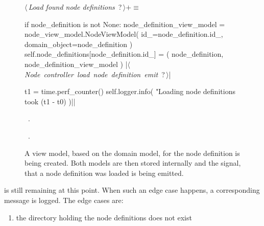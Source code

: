 \documentclass[%
    a4paper,    %
    justified,  %
    nobib,      %
    openany     %
]{tufte-book}
\begin{document}
\begin{figure}[!h]
  \begin{flushleft} \small
\begin{minipage}{\linewidth}\label{scrap8}\raggedright\small
{} $\langle\,${\itshape Load found node definitions}\nobreak\ {\footnotesize {?}}$\,\rangle+\equiv$
\vspace{-1ex}
\begin{pythoncode}
    if node_definition is not None:
        node_definition_view_model = node_view_model.NodeViewModel(
            id_=node_definition.id_,
            domain_object=node_definition
        )
        self.node_definitions[node_definition.id_] = (
            node_definition,
            node_definition_view_model
        )
        |\hbox{$\langle\,${\itshape Node controller load node definition emit}\nobreak\ {\footnotesize ?}$\,\rangle$}|

t1 = time.perf_counter()
self.logger.info(
    "Loading node definitions took %
    (t1 - t0)
)|\NWsep|
\end{pythoncode}
\vspace{1.5ex}
\footnotesize
\begin{list}{}{\setlength{\itemsep}{-\parsep}\setlength{\itemindent}{-\leftmargin}}
\item \NWtxtMacroDefBy\ .
\item \NWtxtMacroRefIn\ .

\item{}
\end{list}
\end{minipage}\vspace{4ex}
\end{flushleft}
\caption{A view model, based on the domain model, for the node definition is
    being created. Both models are then stored internally and the signal, that a
    node definition was loaded is being emitted.}
  \label{lst:nodes-controller-load-node-defs-2}
\end{figure}

\newpage{}

 is still remaining at this
point. When such an edge case happens, a corresponding message is logged. The
edge cases are:

\begin{enumerate}
  \item the directory holding the node definitions does not exist
\end{enumerate}
\end{document}
